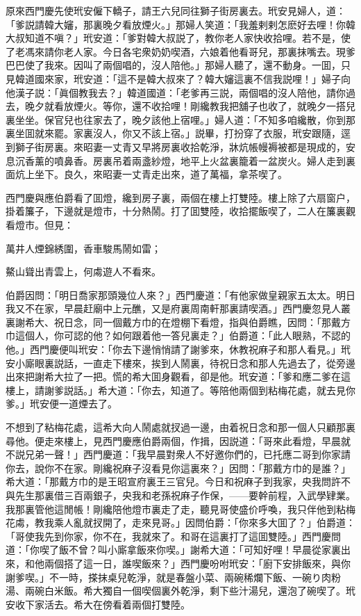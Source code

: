 原來西門慶先使玳安僱下轎子，請王六兒同往獅子街房裏去。玳安見婦人，道：「爹説請韓大嬸，那裏晚夕看放煙火。」那婦人笑道：「我羞剌剌怎麽好去哩！你韓大叔知道不嗔？」玳安道：「爹對韓大叔説了，教你老人家快收拾哩。若不是，使了老馮來請你老人家。今日各宅衆奶奶喫酒，六娘着他看哥兒，那裏抹嘴去。現爹巴巴使了我來。因叫了兩個唱的，沒人陪他。」那婦人聽了，還不動身。一囬，只見韓道國來家，玳安道：「這不是韓大叔來了？韓大嬸這裏不信我説哩！」婦子向他漢子説：「眞個教我去？」韓道國道：「老爹再三説，兩個唱的沒人陪他，請你過去，晚夕就看放煙火。等你，還不收拾哩！剛纔教我把舖子也收了，就晚夕一搭兒裏坐坐。保官兒也往家去了，晚夕該他上宿哩。」婦人道：「不知多咱纔散，你到那裏坐囬就來罷。家裏沒人，你又不該上宿。」説畢，打扮穿了衣服，玳安跟隨，逕到獅子街房裏。來昭妻一丈青又早將房裏收拾乾淨，牀炕帳幔褥被都是現成的，安息沉香薰的噴鼻香。房裏吊着兩盞紗燈，地平上火盆裏籠着一盆炭火。婦人走到裏面炕上坐下。良久，來昭妻一丈青走出來，道了萬福，拿茶喫了。

西門慶與應伯爵看了囬燈，纔到房子裏，兩個在樓上打雙陸。樓上除了六扇窗户，掛着簾子，下邊就是燈市，十分熱鬧。打了囬雙陸，收拾擺飯喫了，二人在簾裏觀看燈市。但見：

萬井人煙錦綉圍，香車駿馬鬧如雷；

鰲山聳出青雲上，何䖏遊人不看來。

伯爵因問：「明日喬家那頭幾位人來？」西門慶道：「有他家做皇親家五太太。明日我又不在家，早晨赶廟中上元醮，又是府裏周南軒那裏請喫酒。」西門慶忽見人叢裏謝希大、祝日念，同一個戴方巾的在燈棚下看燈，指與伯爵瞧，因問：「那戴方巾這個人，你可認的他？如何跟着他一答兒裏走？」伯爵道：「此人眼熟，不認的他。」西門慶便叫玳安：「你去下邊悄悄請了謝爹來，休教祝麻子和那人看見。」玳安小廝眼裏説話，一直走下樓來，挨到人鬧裏，待祝日念和那人先過去了，從旁邊出來把謝希大拉了一把。慌的希大囬身觀看，卻是他。玳安道：「爹和應二爹在這樓上，請謝爹説話。」希大道：「你去，知道了。等陪他兩個到粘梅花處，就去見你爹。」玳安便一道煙去了。

不想到了粘梅花處，這希大向人鬧處就扠過一邊，由着祝日念和那一個人只顧那裏尋他。便走來樓上，見西門慶應伯爵兩個，作揖，因説道：「哥來此看燈，早晨就不説兄弟一聲！」西門慶道：「我早晨對衆人不好邀你們的，已托應二哥到你家請你去，說你不在家。剛纔祝麻子沒看見你這裏來？」因問：「那戴方巾的是誰？」希大道：「那戴方巾的是王昭宣府裏王三官兒。今日和祝麻子到我家，央我問許不與先生那裏借三百兩銀子，央我和老孫祝麻子作保，——要幹前程，入武學肄業。我那裏管他這閒帳！剛纔陪他燈市裏走了走，聽見哥使盛价呼喚，我只伴他到粘梅花䖏，教我乘人亂就扠開了，走來見哥。」因問伯爵：「你來多大囬了？」伯爵道：「哥使我先到你家，你不在，我就來了。和哥在這裏打了這囬雙陸。」西門慶問道：「你喫了飯不曾？叫小廝拿飯來你喫。」謝希大道：「可知好哩！早晨從家裏出來，和他兩個搭了這一日，誰喫飯來？」西門慶吩咐玳安：「廚下安排飯來，與你謝爹喫。」不一時，搽抹桌兒乾淨，就是春盤小菜、兩碗稀爛下飯、一碗り肉粉湯、兩碗白米飯。希大獨自一個喫個裏外乾淨，剩下些汁湯兒，還泡了碗喫了。玳安收下家活去。希大在傍看着兩個打雙陸。

